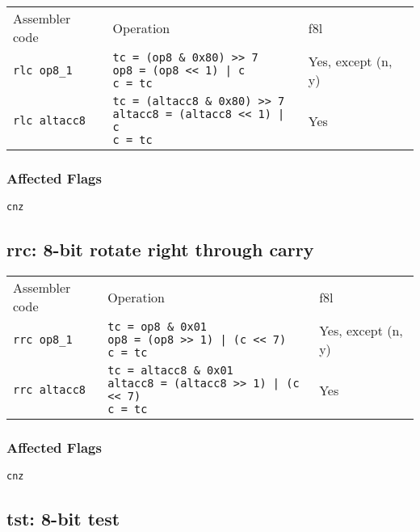 \documentclass{book}
\begin{document}
\begin{tabular}{l l l}
Assembler code       & Operation                                                                                               & f8l \\
\texttt{rlc op8\_1}  & \makecell{\texttt{tc = (op8  \& 0x80) >> 7}\\\texttt{op8 = (op8 << 1) | c}\\\texttt{c = tc}}            & Yes, except (n, y) \\
\texttt{rlc altacc8} & \makecell{\texttt{tc = (altacc8 \& 0x80) >> 7}\\\texttt{altacc8 = (altacc8 << 1) | c}\\\texttt{c = tc}} & Yes
\end{tabular}

\subsubsection*{Affected Flags}

\texttt{cnz}


\subsection{rrc: 8-bit rotate right through carry}

\begin{tabular}{l l l}
Assembler code       & Operation                                                                                               & f8l \\
\texttt{rrc op8\_1}  & \makecell{\texttt{tc = op8  \& 0x01}\\\texttt{op8 = (op8 >> 1) | (c << 7)}\\\texttt{c = tc}}            & Yes, except (n, y) \\
\texttt{rrc altacc8} & \makecell{\texttt{tc = altacc8 \& 0x01}\\\texttt{altacc8 = (altacc8 >> 1) | (c << 7)}\\\texttt{c = tc}} & Yes
\end{tabular}

\subsubsection*{Affected Flags}

\texttt{cnz}


\subsection{tst: 8-bit test}
\end{document}
